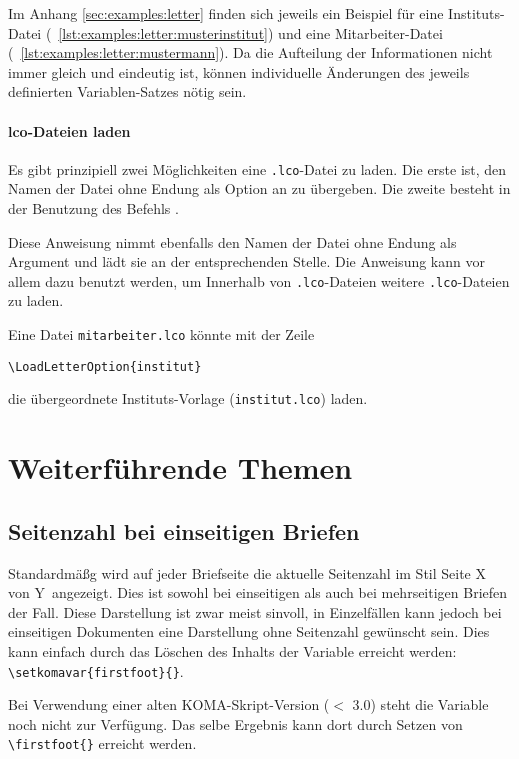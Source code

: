 Im Anhang \ref{sec:examples:letter} finden sich jeweils ein Beispiel für eine
Instituts-Datei (\lstlistingname~\ref{lst:examples:letter:musterinstitut}) und eine Mitarbeiter-Datei
(\lstlistingname~\ref{lst:examples:letter:mustermann}). Da die Aufteilung der Informationen nicht immer 
gleich und eindeutig ist, können individuelle Änderungen des jeweils definierten
Variablen-Satzes nötig sein.

\paragraph{lco-Dateien laden}

Es gibt prinzipiell zwei Möglichkeiten eine \texttt{.lco}-Datei zu laden.
Die erste ist, den Namen der Datei ohne Endung als Option an
 zu übergeben.
Die zweite besteht in der Benutzung des Befehls .

\begin{Declaration}
\end{Declaration}

Diese Anweisung nimmt ebenfalls den Namen der Datei ohne Endung als
Argument und lädt sie an der entsprechenden Stelle.
Die Anweisung kann vor allem dazu benutzt werden, um Innerhalb von
\texttt{.lco}-Dateien weitere \texttt{.lco}-Dateien zu laden.

\begin{example}
  Eine Datei \lstinline{mitarbeiter.lco} könnte mit der Zeile
\begin{lstlisting}
\LoadLetterOption{institut}
\end{lstlisting}
  die übergeordnete Instituts-Vorlage (\lstinline{institut.lco}) laden.
\end{example}

\section{Weiterführende Themen}

\subsection{Seitenzahl bei einseitigen Briefen}

Standardmäßg wird auf jeder Briefseite die aktuelle Seitenzahl
im Stil \glqq Seite X von Y\grqq\ angezeigt. Dies ist sowohl bei einseitigen
als auch bei mehrseitigen Briefen der Fall.
Diese Darstellung ist zwar meist sinvoll, in Einzelfällen kann jedoch bei
einseitigen Dokumenten eine Darstellung ohne Seitenzahl gewünscht sein.
Dies kann einfach durch das Löschen des Inhalts der Variable
 erreicht werden: \lstinline!\setkomavar{firstfoot}{}!.

\begin{important}
  Bei Verwendung einer alten KOMA-Skript-Version ($<$ 3.0) steht die
  Variable  noch nicht zur Verfügung.
  Das selbe Ergebnis kann dort durch Setzen von \lstinline!\firstfoot{}!
  erreicht werden.
\end{important}



